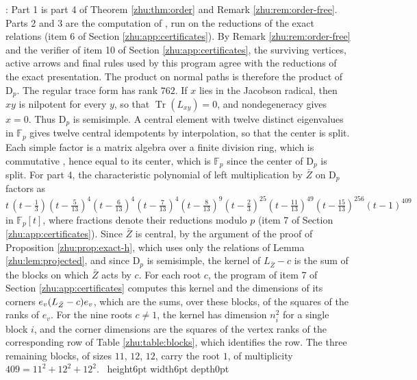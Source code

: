 \documentclass[leqno]{article}
\newcommand{\D}{\mathrm{D}}
\newcommand{\qed}{\hfill \vrule height6pt  width6pt depth0pt}
\DeclareMathOperator{\Tr}{Tr}
\let\ker\relax
\DeclareMathOperator{\ker}{Ker}
\newenvironment{proof}[1][]{\noindent {\it Proof #1} : }{\hbox{~}\qed
\smallskip
}
\numberwithin{equation}{section}
\begin{document}
\begin{proof}
Part 1 is part 4 of Theorem \ref{zhu:thm:order} and Remark \ref{zhu:rem:order-free}. Parts 2 and 3 are the computation of \cite[Theorem 11.6]{Arh26}, run on the reductions of the exact relations (item 6 of Section \ref{zhu:app:certificates}). By Remark \ref{zhu:rem:order-free} and the verifier of item 10 of Section \ref{zhu:app:certificates}, the surviving vertices, active arrows and final rules used by this program agree with the reductions of the exact presentation. The product on normal paths is therefore the product of $\D_p$. The regular trace form has rank $762$. If $x$ lies in the Jacobson radical, then $xy$ is nilpotent for every $y$, so that $\Tr(L_{xy}) = 0$, and nondegeneracy gives $x = 0$. Thus $\D_p$ is semisimple. A central element with twelve distinct eigenvalues in $\mathbb F_p$ gives twelve central idempotents by interpolation, so that the center is split. Each simple factor is a matrix algebra over a finite division ring, which is commutative \cite{Wed05}, hence equal to its center, which is $\mathbb F_p$ since the center of $\D_p$ is split. For part 4, the characteristic polynomial of left multiplication by $\bar Z$ on $\D_p$ factors as
\[
t\,(t - \tfrac13)(t - \tfrac{5}{13})^4(t - \tfrac{6}{13})^4(t-\tfrac{7}{13})^4(t - \tfrac{8}{13})^9(t - \tfrac23)^{25}(t - \tfrac{11}{13})^{49}(t - \tfrac{15}{13})^{256}(t-1)^{409}
\]
in $\mathbb F_p[t]$, where fractions denote their reductions modulo $p$ (item 7 of Section \ref{zhu:app:certificates}). Since $\bar Z$ is central, by the argument of the proof of Proposition \ref{zhu:prop:exact-h}, which uses only the relations of Lemma \ref{zhu:lem:projected}, and since $\D_p$ is semisimple, the kernel of $L_{\bar Z} - c$ is the sum of the blocks on which $\bar Z$ acts by $c$. For each root $c$, the program of item 7 of Section \ref{zhu:app:certificates} computes this kernel and the dimensions of its corners $e_v \ker(L_{\bar Z} - c) e_v$, which are the sums, over these blocks, of the squares of the ranks of $e_v$. For the nine roots $c \neq 1$, the kernel has dimension $n_i^2$ for a single block $i$, and the corner dimensions are the squares of the vertex ranks of the corresponding row of Table \ref{zhu:table:blocks}, which identifies the row. The three remaining blocks, of sizes $11$, $12$, $12$, carry the root $1$, of multiplicity $409 = 11^2 + 12^2 + 12^2$.
\end{proof}
\end{document}
